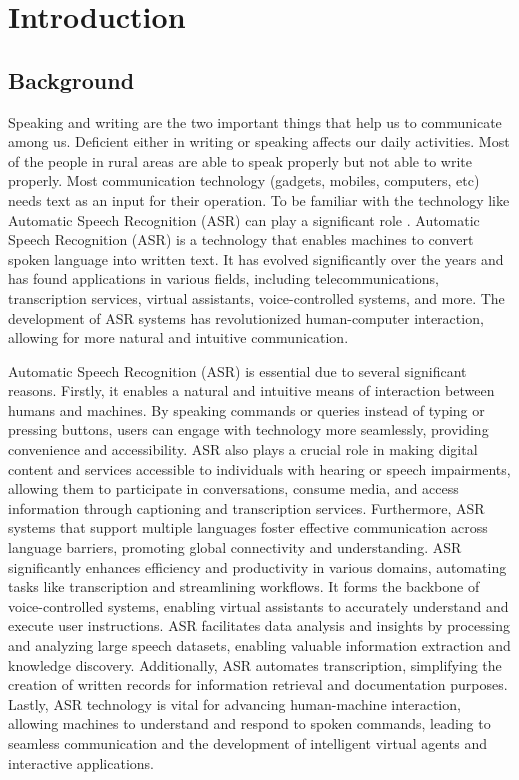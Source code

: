
\newpage
{} %

\chapter{Introduction}
\section{Background}\label{sec:bkgrnd}%
Speaking and writing are the two important things that help us to communicate among us. Deficient either in writing or speaking affects our daily activities. Most of the people in rural areas are able to speak properly but not able to write properly. Most communication technology (gadgets, mobiles, computers, etc) needs text as an input for their operation. To be familiar with the technology like Automatic Speech Recognition (ASR) can play a significant role \cite{bhatta2020nepali}. Automatic Speech Recognition (ASR) is a technology that enables machines to convert spoken language into written text. It has evolved significantly over the years and has found applications in various fields, including telecommunications, transcription services, virtual assistants, voice-controlled systems, and more. The development of ASR systems has revolutionized human-computer interaction, allowing for more natural and intuitive communication.

Automatic Speech Recognition (ASR) is essential due to several significant reasons. Firstly, it enables a natural and intuitive means of interaction between humans and machines. By speaking commands or queries instead of typing or pressing buttons, users can engage with technology more seamlessly, providing convenience and accessibility. ASR also plays a crucial role in making digital content and services accessible to individuals with hearing or speech impairments, allowing them to participate in conversations, consume media, and access information through captioning and transcription services. Furthermore, ASR systems that support multiple languages foster effective communication across language barriers, promoting global connectivity and understanding. ASR significantly enhances efficiency and productivity in various domains, automating tasks like transcription and streamlining workflows. It forms the backbone of voice-controlled systems, enabling virtual assistants to accurately understand and execute user instructions. ASR facilitates data analysis and insights by processing and analyzing large speech datasets, enabling valuable information extraction and knowledge discovery. Additionally, ASR automates transcription, simplifying the creation of written records for information retrieval and documentation purposes. Lastly, ASR technology is vital for advancing human-machine interaction, allowing machines to understand and respond to spoken commands, leading to seamless communication and the development of intelligent virtual agents and interactive applications.



